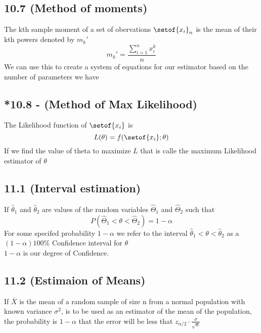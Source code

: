 \documentclass[answers,12pt,addpoints]{exam}
\begin{document}
\subsection{10.7 (Method of moments)}
\begin{definition}
    The kth sample moment of a set of obervations $\setof{x_i}_n$ is the mean of their kth powers denoted by $m_k'$
    $$ m_k' = \frac{\sum_{i=1}^{n} x_i^k}{n}$$
    We can use this to create a system of equations for our estimator based on the number of parameters we have
\end{definition}

\subsection{*10.8 - (Method of Max Likelihood)}
\begin{definition}
    The Likelihood function of $\setof{x_i}$ is 
    $$ L(\theta) = f(\setof{x_i}; \theta)$$
    If we find the value of theta to maximize $L$ that is calle the maximum Likelihood estimator of $\theta$
\end{definition}

\subsection{11.1 (Interval estimation)}
\begin{definition}
    If $\hat{\theta}_1$ and $\hat{\theta}_2$ are values of the random variables $\hat{\Theta}_1$ and $\hat{\Theta}_2$ such that 
    $$ P(\hat{\Theta}_1 <\theta < \hat{\Theta}_2) = 1 - \alpha$$
    For some specifed probability $1-\alpha$ we refer to the interval $\hat{\theta}_1 < \theta < \hat{\theta}_2$ as a $(1-\alpha)100$\% Confidence interval for $\theta$\\
    $1-\alpha$ is our degree of Confidence.
\end{definition}

\subsection{11.2 (Estimaion of Means)}
\begin{theorem}
    If $\bar{X}$ is the mean of a random sample of size n from a normal population with known variance $\sigma^2$, is to be used as an estimator of the mean of the population, the probability is $1-\alpha$ that the error will be less that $z_{\alpha/2} \cdot \frac{\sigma}{\sqrt{n}}$
\end{theorem}
\end{document}
